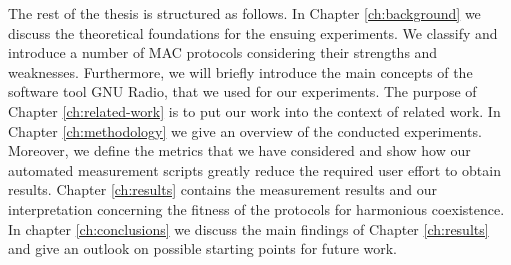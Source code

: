 The rest of the thesis is structured as follows. In Chapter \ref{ch:background} we discuss the theoretical foundations for the ensuing experiments. We classify and introduce a number of MAC protocols considering their strengths and weaknesses. Furthermore, we will briefly introduce the main concepts of the software tool GNU Radio, that we used for our experiments. The purpose of Chapter \ref{ch:related-work} is to put our work into the context of related work.
In Chapter \ref{ch:methodology} we give an overview of the conducted experiments. Moreover, we define the metrics that we have considered and show how our automated measurement scripts greatly reduce the required user effort to obtain results.
Chapter \ref{ch:results} contains the measurement results and our interpretation concerning the fitness of the protocols for harmonious coexistence. 
In chapter \ref{ch:conclusions} we discuss the main findings of Chapter \ref{ch:results} and give an outlook on possible starting points for future work.